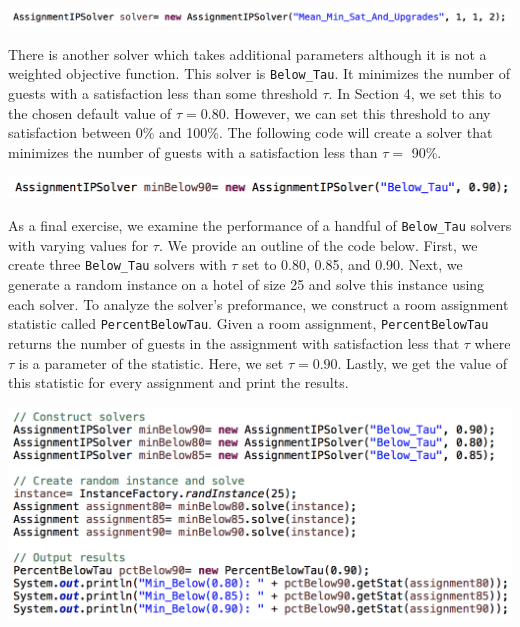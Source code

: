 \documentclass[11 pt]{article}
\begin{document}
\begin{center}
\includegraphics[scale=0.7]{images/weightedObj.png}
\end{center}
\par There is another solver which takes additional parameters although it is not a weighted objective function. This solver is \texttt{Below\_Tau}. It minimizes the number of guests with a satisfaction less than some threshold $\tau$. In Section 4, we set this to the chosen default value of $\tau = 0.80$. However, we can set this threshold to any satisfaction between 0\% and 100\%. The following code will create a solver that minimizes the number of guests with a satisfaction less than $\tau =$ 90\%.
\begin{center}
\includegraphics[scale=0.7]{images/BelowTauCode.png}
\end{center}
\par As a final exercise, we examine the performance of a handful of \texttt{Below\_Tau} solvers with varying values for $\tau$. We provide an outline of the code below. First, we create three \texttt{Below\_Tau} solvers with $\tau$ set to 0.80, 0.85, and 0.90. Next, we generate a random instance on a hotel of size 25 and solve this instance using each solver. To analyze the solver's preformance, we construct a room assignment statistic called \texttt{PercentBelowTau}. Given a room assignment, \texttt{PercentBelowTau} returns the number of guests in the assignment with satisfaction less that $\tau$ where $\tau$ is a parameter of the statistic. Here, we set $\tau = 0.90$. Lastly, we get the value of this statistic for every assignment and print the results. 
\begin{center}
\includegraphics[scale=0.7]{images/BelowTauEx.png}
\end{center}
\end{document}
